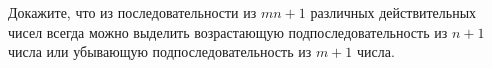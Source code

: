 \documentclass{article}
\begin{document}
Докажите, что из последовательности из $mn+1$ различных действительных чисел всегда можно
выделить возрастающую подпоследовательность из $n+1$ числа или убывающую подпоследовательность из $m+1$ числа.
\end{document}
